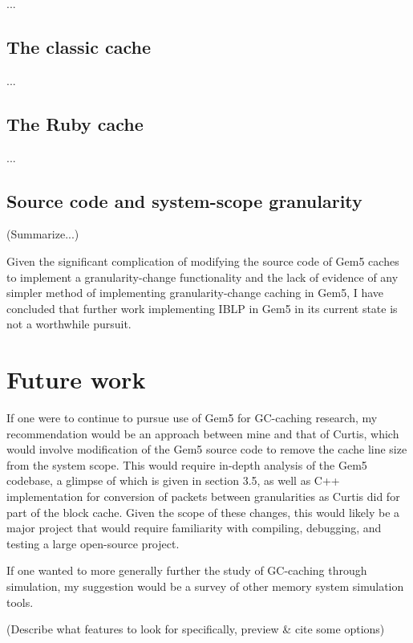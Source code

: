 \documentclass[12pt,twoside]{reedthesis}
\newcommand{\revise}[1]{{\color{red}#1}}
\begin{document}
	...

	\subsection*{The classic cache}

	...

	\subsection*{The Ruby cache}

	...

	\subsection*{Source code and system-scope granularity}

	\revise{(Summarize...)}

	Given the significant complication of modifying the source code of Gem5 caches to implement a granularity-change functionality and the lack of evidence of any simpler method of implementing granularity-change caching in Gem5, I have concluded that further work implementing IBLP in Gem5 in its current state is not a worthwhile pursuit.

\section{Future work}

If one were to continue to pursue use of Gem5 for GC-caching research, my recommendation would be an approach between mine and that of Curtis, which would involve modification of the Gem5 source code to remove the cache line size from the system scope. This would require in-depth analysis of the Gem5 codebase, a glimpse of which is given in section 3.5, as well as C++ implementation for conversion of packets between granularities as Curtis did for part of the block cache. Given the scope of these changes, this would likely be a major project that would require familiarity with compiling, debugging, and testing a large open-source project.

If one wanted to more generally further the study of GC-caching through simulation, my suggestion would be a survey of other memory system simulation tools.

\revise{(Describe what features to look for specifically, preview \& cite some options)}

\appendix
\end{document}
